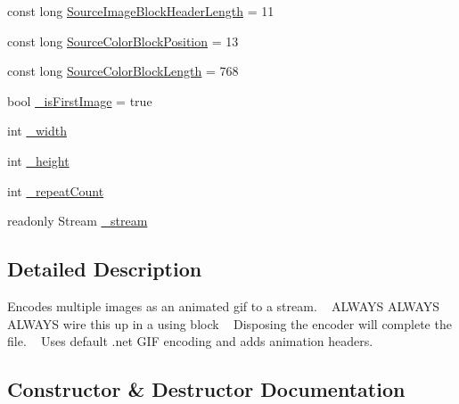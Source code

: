 \begin{DoxyCompactItemize}
\item 
const long \mbox{\hyperlink{class_paint___program_1_1_gif_encoder_a1456c9cebb7e488514962743ac66d4cb}{Source\+Image\+Block\+Header\+Length}} = 11
\item 
const long \mbox{\hyperlink{class_paint___program_1_1_gif_encoder_a984a37788cb7c1ce3bd627a5a08e6e50}{Source\+Color\+Block\+Position}} = 13
\item 
const long \mbox{\hyperlink{class_paint___program_1_1_gif_encoder_a71eec2f591f9af7cb0b4d11d332df5a3}{Source\+Color\+Block\+Length}} = 768
\item 
bool \mbox{\hyperlink{class_paint___program_1_1_gif_encoder_a5de80ade0a9551f597da31f92b9d95eb}{\+\_\+is\+First\+Image}} = true
\item 
int \mbox{\hyperlink{class_paint___program_1_1_gif_encoder_a88e3a78c4e50284dcd716d73a8af55ae}{\+\_\+width}}
\item 
int \mbox{\hyperlink{class_paint___program_1_1_gif_encoder_a4f7b81f0b47ceffb51b3cfd7a1e32164}{\+\_\+height}}
\item 
int \mbox{\hyperlink{class_paint___program_1_1_gif_encoder_a238128613b44b86390393269f2768495}{\+\_\+repeat\+Count}}
\item 
readonly Stream \mbox{\hyperlink{class_paint___program_1_1_gif_encoder_a1b44df333c1ce4ebfebf59616352adf9}{\+\_\+stream}}
\end{DoxyCompactItemize}


\subsection{Detailed Description}
Encodes multiple images as an animated gif to a stream. ~\newline
 A\+L\+W\+A\+YS A\+L\+W\+A\+YS A\+L\+W\+A\+YS wire this up in a using block ~\newline
 Disposing the encoder will complete the file. ~\newline
 Uses default .net G\+IF encoding and adds animation headers. 



\subsection{Constructor \& Destructor Documentation}
\mbox{\label{class_paint___program_1_1_gif_encoder_aa5dfacef849ac58b11453ced6cb559e2}} 
